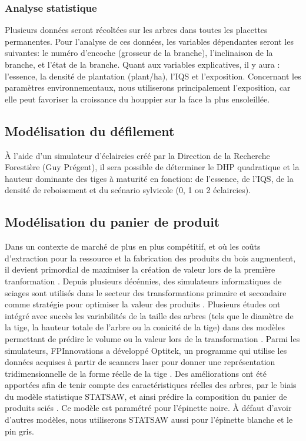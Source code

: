 \documentclass[letterpaper, 12pt]{article}
\begin{document}
\begin{onehalfspace}
\subsubsection{Analyse statistique}

Plusieurs données seront récoltées sur les arbres dans toutes les placettes permanentes. Pour l'analyse de ces données, les variables dépendantes seront les suivantes: le numéro d'encoche (grosseur de la branche), l'inclinaison de la branche, et l'état de la branche. Quant aux variables explicatives, il y aura : l'essence, la densité de plantation (plant/ha), l'IQS et l'exposition. Concernant les paramètres environnementaux, nous utiliserons principalement l'exposition, car elle peut favoriser la croissance du houppier sur la face la plus ensoleillée. 

\subsection{Modélisation du défilement}

À l’aide d’un simulateur d’éclaircies créé par la Direction de la Recherche Forestière (Guy Prégent), il sera possible de déterminer le DHP quadratique et la hauteur dominante des tiges à maturité en fonction: de l’essence, de l’IQS, de la densité de reboisement et du scénario sylvicole (0, 1 ou 2 éclaircies). 

\subsection{Modélisation du panier de produit}

Dans un contexte de marché de plus en plus compétitif, et où les coûts d'extraction pour la ressource et la fabrication des produits du bois augmentent, il devient primordial de maximiser la création de valeur lors de la première tranformation \cite{Briggs2010, Walker2013}. Depuis plusieurs décénnies, des simulateurs informatiques de sciages sont utilisés dans le secteur des transformations primaire et secondaire comme stratégie pour optimiser la valeur des produits \cite{FPInnovations2014}. Plusieurs études ont intégré avec succès les variabilités de la taille des arbres (tels que le diamètre de la tige, la hauteur totale de l’arbre ou la conicité de la tige) dans des modèles permettant de prédire le volume ou la valeur lors de la transformation \cite{Barrette2012,Liu2007}. Parmi les simulateurs, FPInnovations a développé Optitek, un programme qui utilise les données acquises à partir de scanners laser pour donner une représentation tridimensionnelle de la forme réelle de la tige \cite{FPInnovations2014}. Des améliorations ont été apportées afin de tenir compte des caractéristiques réelles des arbres, par le biais du modèle statistique STATSAW, et ainsi prédire la composition du panier de produits sciés \cite{Auty2014}. Ce modèle est paramétré pour l'épinette noire. À défaut d'avoir d'autres modèles, nous utiliserons STATSAW aussi pour l'épinette blanche et le pin gris.


\end{onehalfspace}
\end{document}
